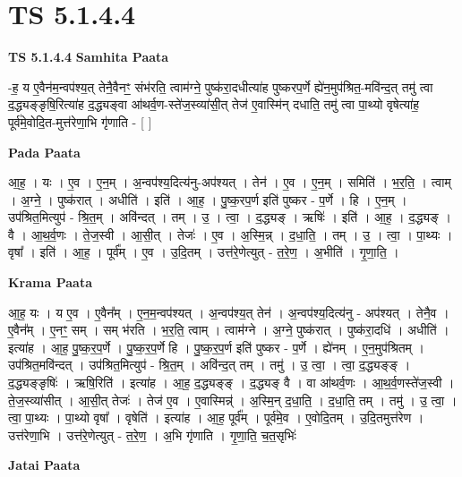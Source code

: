 \documentclass[17pt]{extarticle}
\begin{document}
\section{ TS 5.1.4.4 }

\textbf{TS 5.1.4.4 } \newline
\textbf{Samhita Paata} \newline

-ह॒ य ए॒वैन॑म॒न्वप॑श्य॒त् तेनै॒वैनꣳ॒॒ संभ॑रति॒ त्वाम॑ग्ने॒ पुष्क॑रा॒दधीत्या॑ह पुष्करप॒र्णे ह्ये॑न॒मुप॑श्रित॒-मवि॑न्द॒त् तमु॑ त्वा द॒द्ध्यङ्ङृषि॒रित्या॑ह द॒द्ध्यङ्वा आ॑थर्व॒ण-स्ते॑ज॒स्व्या॑सी॒त् तेज॑ ए॒वास्मि॑न् दधाति॒ तमु॑ त्वा पा॒थ्यो वृषेत्या॑ह॒ पूर्व॑मे॒वोदि॒त-मुत्त॑रेणा॒भि गृ॑णाति - [  ] \newline

\textbf{Pada Paata} \newline

आ॒ह॒ । यः । ए॒व । ए॒न॒म् । अ॒न्वप॑श्य॒दित्य॑नु-अप॑श्यत् । तेन॑ । ए॒व । ए॒न॒म् । समिति॑ । भ॒र॒ति॒ । त्वाम् । अ॒ग्ने॒ । पुष्क॑रात् । अधीति॑ । इति॑ । आ॒ह॒ । पु॒ष्क॒रप॒र्ण इति॑ पुष्कर - प॒र्णे । हि । ए॒न॒म् । उप॑श्रित॒मित्युप॑ - श्रि॒त॒म् । अवि॑न्दत् । तम् । उ॒ । त्वा॒ । द॒द्ध्यङ् । ऋषिः॑ । इति॑ । आ॒ह॒ । द॒द्ध्यङ् । वै । आ॒थ॒र्व॒णः । ते॒ज॒स्वी । आ॒सी॒त् । तेजः॑ । ए॒व । अ॒स्मि॒न्न् । द॒धा॒ति॒ । तम् । उ॒ । त्वा॒ । पा॒थ्यः । वृषा᳚ । इति॑ । आ॒ह॒ । पूर्व᳚म् । ए॒व । उ॒दि॒तम् । उत्त॑रे॒णेत्युत् - त॒रे॒ण॒ । अ॒भीति॑ । गृ॒णा॒ति॒ ।  \newline


\textbf{Krama Paata} \newline

आ॒ह॒ यः । य ए॒व । ए॒वैन᳚म् । ए॒न॒म॒न्वप॑श्यत् । अ॒न्वप॑श्य॒त् तेन॑ । अ॒न्वप॑श्य॒दित्य॑नु - अप॑श्यत् । तेनै॒व । ए॒वैन᳚म् । ए॒नꣳ॒॒ सम् । सम् भ॑रति । भ॒र॒ति॒ त्वाम् । त्वाम॑ग्ने । अ॒ग्ने॒ पुष्क॑रात् । पुष्क॑रा॒दधि॑ । अधीति॑ । इत्या॑ह । आ॒ह॒ पु॒ष्क॒र॒प॒र्णे । पु॒ष्क॒र॒प॒र्णे हि । पु॒ष्क॒र॒प॒र्ण इति॑ पुष्कर - प॒र्णे । ह्ये॑नम् । ए॒न॒मुप॑श्रितम् । उप॑श्रित॒मवि॑न्दत् । उप॑श्रित॒मित्युप॑ - श्रि॒त॒म् । अवि॑न्द॒त् तम् । तमु॑ । उ॒ त्वा॒ । त्वा॒ द॒द्ध्यङ्ङ् । द॒द्ध्यङ्ङृषिः॑ । ऋषि॒रिति॑ । इत्या॑ह । आ॒ह॒ द॒द्ध्यङ्ङ् । द॒द्ध्यङ् वै । वा आ॑थर्व॒णः । आ॒थ॒र्व॒णस्ते॑ज॒स्वी । ते॒ज॒स्व्या॑सीत् । आ॒सी॒त् तेजः॑ । तेज॑ ए॒व । ए॒वास्मिन्न्॑ । अ॒स्मि॒न् द॒धा॒ति॒ । द॒धा॒ति॒ तम् । तमु॑ । उ॒ त्वा॒ । त्वा॒ पा॒थ्यः । पा॒थ्यो वृषा᳚ । वृषेति॑ । इत्या॑ह । आ॒ह॒ पूर्व᳚म् । पूर्व॑मे॒व । ए॒वोदि॒तम् । उ॒दि॒तमुत्त॑रेण । उत्त॑रेणा॒भि । उत्त॑रे॒णेत्युत् - त॒रे॒ण॒ । अ॒भि गृ॑णाति । गृ॒णा॒ति॒ च॒त॒सृभिः॑ \newline

\textbf{Jatai Paata} \newline
\end{document}
